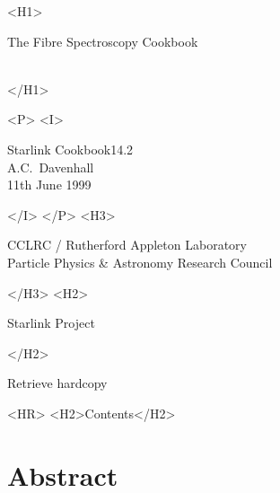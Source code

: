\documentclass[twoside,11pt]{article}
\newcommand{\stardoccategory}  {Starlink Cookbook}
\newcommand{\stardocsource}    {sc\stardocnumber}
\newcommand{\stardocnumber}    {14.2}
\newcommand{\stardocauthors}   {A.C.~Davenhall}
\newcommand{\stardocdate}      {11th June 1999}
\newcommand{\stardoctitle}     {The Fibre Spectroscopy Cookbook}
\newcommand{\htmladdnormallink}[2]{#1}
\newcommand{\htmladdimg}[1]{}
\newcommand{\htmlref}[2]{#1}
\newcommand{\htmladdtonavigation}[1]{}
\newcommand{\xlabel}[1]{}
\newcommand{\latexonlytoc}[0]{\tableofcontents}
\begin{document}
\begin{htmlonly}
   \xlabel{}
   \begin{rawhtml} <H1> \end{rawhtml}
      \stardoctitle\\
      \stardocversion\\
      \stardocmanual
   \begin{rawhtml} </H1> \end{rawhtml}


   \begin{rawhtml} <P> <I> \end{rawhtml}
   \stardoccategory \stardocnumber \\
   \stardocauthors \\
   \stardocdate
   \begin{rawhtml} </I> </P> <H3> \end{rawhtml}
      \htmladdnormallink{CCLRC}{http://www.cclrc.ac.uk} /
      \htmladdnormallink{Rutherford Appleton Laboratory}
                        {http://www.cclrc.ac.uk/ral} \\
      \htmladdnormallink{Particle Physics \& Astronomy Research Council}
                        {http://www.pparc.ac.uk} \\
   \begin{rawhtml} </H3> <H2> \end{rawhtml}
      \htmladdnormallink{Starlink Project}{http://star-www.rl.ac.uk/}
   \begin{rawhtml} </H2> \end{rawhtml}
   \htmladdnormallink{\htmladdimg{source.gif} Retrieve hardcopy}
      {http://star-www.rl.ac.uk/cgi-bin/hcserver?\stardocsource}\\

  \label{stardoccontents}
  \begin{rawhtml} 
    <HR>
    <H2>Contents</H2>
  \end{rawhtml}
  \newcommand{\latexonlytoc}[0]{}
  \htmladdtonavigation{\htmlref{\htmladdimg{contents_motif.gif}}
        {stardoccontents}}

  \section{\xlabel{abstract}Abstract}
\end{htmlonly}
\end{document}
